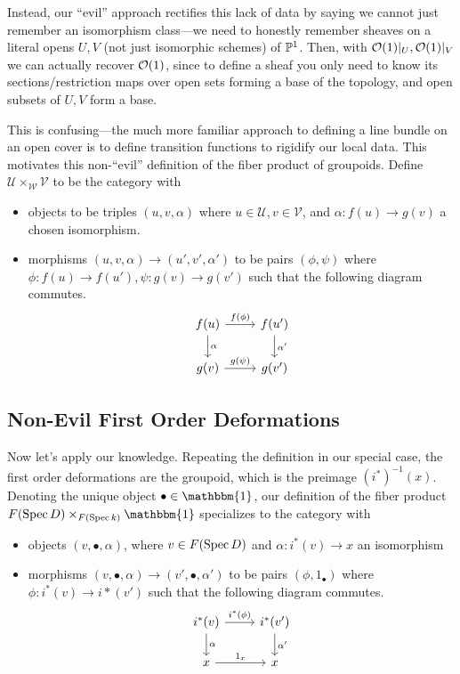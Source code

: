 \documentclass[12pt]{article}
\begin{document}
Instead, our ``evil'' approach rectifies this lack of data by saying we cannot just remember an isomorphism class---we need to honestly remember sheaves on a literal opens $U,V$ (not just isomorphic schemes) of $\P^1$. Then, with $\cO(1)|_U, \cO(1)|_V$ we can actually recover $\cO(1)$, since to define a sheaf you only need to know its sections/restriction maps over open sets forming a base of the topology, and open subsets of $U,V$ form a base.

This is confusing---the much more familiar approach to defining a line bundle on an open cover is to define transition functions to rigidify our local data. This motivates this non-``evil'' definition of the fiber product of groupoids. Define $\mathcal{U} \times_{\mathcal{W}} \mathcal{V}$ to be the category with
\begin{itemize}
    \item objects to be triples $(u,v,\alpha)$ where $u\in \mathcal{U},v\in \mathcal{V}$, and $\alpha: f(u) \to g(v)$ a chosen isomorphism.
    \item morphisms $(u,v,\alpha)\to (u',v',\alpha')$ to be pairs $(\phi,\psi)$ where $\phi: f(u)\to f(u'),\psi: g(v)\to g(v')$ such that the following diagram commutes.
    \[\begin{tikzcd}
        f(u) \rar["f(\phi)"] \dar["\alpha"] & f(u') \dar["\alpha'"]\\
        g(v) \rar["g(\psi)"] & g(v')
    \end{tikzcd}\] 
\end{itemize}

\subsection{Non-Evil First Order Deformations}

Now let's apply our knowledge. Repeating the definition in our special case, the first order deformations are the groupoid, which is the preimage $(i^*)^{-1}(x)$. Denoting the unique object $\bullet\in \mathbbm{1}$, our definition of the fiber product $F(\Spec D)\times_{F(\Spec k)} \mathbbm{1}$ specializes to the category with
\begin{itemize}
    \item objects $(v,\bullet,\alpha)$, where $v\in F(\Spec D)$ and $\alpha: i^*(v) \to x$ an isomorphism
    \item morphisms $(v,\bullet,\alpha) \to (v',\bullet,\alpha')$ to be pairs $(\phi,1_\bullet)$ where $\phi: i^*(v) \to i*(v')$ such that the following diagram commutes.
    \[\begin{tikzcd}
        i^*(v) \rar["i^*(\phi)"] \dar["\alpha"] & i^*(v') \dar["\alpha'"]\\
        x \rar["1_x"] & x
    \end{tikzcd}\] 
\end{itemize}
\end{document}
